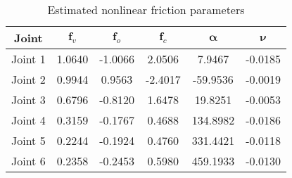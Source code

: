\begin{table}
\centering
\caption{Estimated nonlinear friction parameters}
\label{tab:friction}
\begin{tabular}{|c|c|c|c|c|c|} 
\hline
\textbf{Joint} & $\bm f_v$ & $\bm f_o$ & $\bm f_c$ & $\bm\alpha$ & $\bm\nu$ \\ 
\hline
Joint 1 & 1.0640 & -1.0066 & 2.0506 & 7.9467 & -0.0185 \\
Joint 2 & 0.9944 & 0.9563 & -2.4017 & -59.9536 & -0.0019 \\
Joint 3 & 0.6796 & -0.8120 & 1.6478 & 19.8251 & -0.0053 \\
Joint 4 & 0.3159 & -0.1767 & 0.4688 & 134.8982 & -0.0186 \\
Joint 5 & 0.2244 & -0.1924 & 0.4760 & 331.4421 & -0.0118 \\
Joint 6 & 0.2358 & -0.2453 & 0.5980 & 459.1933 & -0.0130 \\
\hline
\end{tabular}
\end{table}